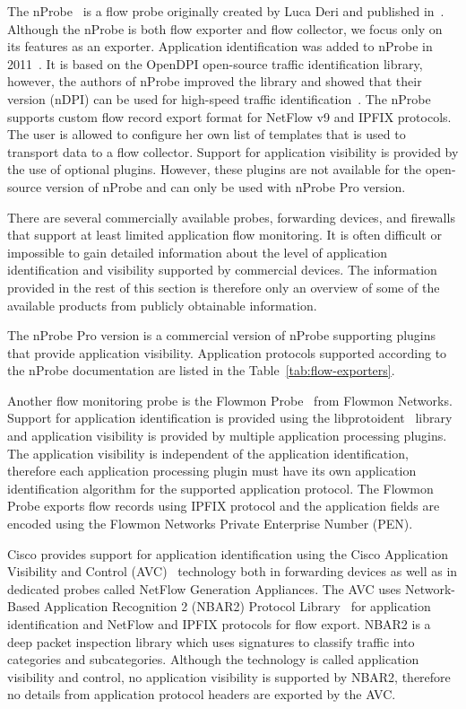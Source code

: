 The nProbe~\cite{Deri-2003-nProbe} is a flow probe originally created by Luca Deri and published in~\citeyear{Deri-2003-nProbe}. Although the nProbe is both flow exporter and flow collector, we focus only on its features as an exporter. Application identification was added to nProbe in 2011~\cite{ntop-2011-Unveiling}. It is based on the OpenDPI open-source traffic identification library, however, the authors of nProbe improved the library and showed that their version (nDPI) can be used for high-speed traffic identification~\cite{Deri-2014-nDPI}. The nProbe supports custom flow record export format for NetFlow v9 and IPFIX protocols. The user is allowed to configure her own list of templates that is used to transport data to a flow collector. Support for application visibility is provided by the use of optional plugins. However, these plugins are not available for the open-source version of nProbe and can only be used with nProbe Pro version.

There are several commercially available probes, forwarding devices, and firewalls that support at least limited application flow monitoring. It is often difficult or impossible to gain detailed information about the level of application identification and visibility supported by commercial devices. The information provided in the rest of this section is therefore only an overview of some of the available products from publicly obtainable information.

The nProbe Pro version is a commercial version of nProbe supporting plugins that provide application visibility. Application protocols supported according to the nProbe documentation are listed in the Table~\ref{tab:flow-exporters}.

Another flow monitoring probe is the Flowmon Probe~\cite{FlowmonNetworks--Flowmon} from Flowmon Networks. Support for application identification is provided using the libprotoident~\cite{Alcock-2012-libprotoident} library and application visibility is provided by multiple application processing plugins. The application visibility is independent of the application identification, therefore each application processing plugin must have its own application identification algorithm for the supported application protocol. The Flowmon Probe exports flow records using IPFIX protocol and the application fields are encoded using the Flowmon Networks Private Enterprise Number (PEN).

Cisco provides support for application identification using the Cisco Application Visibility and Control (AVC)~\cite{CiscoSystems--Cisco} technology both in forwarding devices as well as in dedicated probes called NetFlow Generation Appliances. The AVC uses Network-Based Application Recognition 2 (NBAR2) Protocol Library~\cite{CiscoSystems--NBAR2} for application identification and NetFlow and IPFIX protocols for flow export. NBAR2 is a deep packet inspection library which uses signatures to classify traffic into categories and subcategories. Although the technology is called application visibility and control, no application visibility is supported by NBAR2, therefore no details from application protocol headers are exported by the AVC. 

